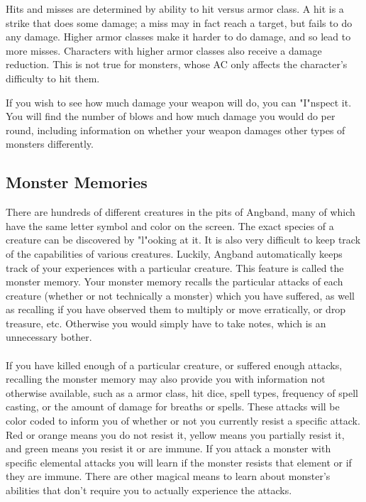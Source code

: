 Hits and misses are determined by ability to hit versus armor class. A hit
is a strike that does some damage; a miss may in fact reach a target, but
fails to do any damage. Higher armor classes make it harder to do damage,
and so lead to more misses. Characters with higher armor classes also
receive a damage reduction. This is not true for monsters, whose AC only
affects the character's difficulty to hit them.

If you wish to see how much damage your weapon will do, you can "I"nspect it.
You will find the number of blows and how much damage you would do per round,
including information on whether your weapon damages other types of
monsters differently.

\subsection{Monster Memories}

There are hundreds of different creatures in the pits of Angband, many of
which have the same letter symbol and color on the screen. The exact species
of a creature can be discovered by "l"ooking at it. It is also very difficult
to keep track of the capabilities of various creatures. Luckily, Angband
automatically keeps track of your experiences with a particular creature.
This feature is called the monster memory. Your monster memory recalls the
particular attacks of each creature (whether or not technically a monster)
which you have suffered, as well as recalling if you have observed them to
multiply or move erratically, or drop treasure, etc. Otherwise you would
simply have to take notes, which is an unnecessary bother.

\paragraph{}If you have killed enough of a particular creature, or suffered enough
attacks, recalling the monster memory may also provide you with
information not otherwise available, such as a armor class, hit dice,
spell types, frequency of spell casting, or the amount of damage for
breaths or spells. These attacks will be color coded to inform you of
whether or not you currently resist a specific attack. Red or orange
means you do not resist it, yellow means you partially resist it, and
green means you resist it or are immune. If you attack a monster with
specific elemental attacks you will learn if the monster resists that
element or if they are immune. There are other magical means to learn
about monster's abilities that don't require you to actually experience
the attacks.
 
